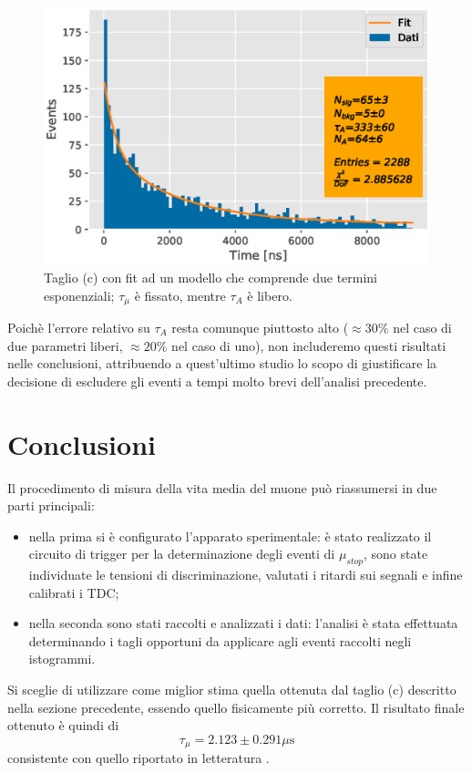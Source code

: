 \documentclass{standalone}
\begin{document}
\begin{figure}[H]
  \centering
  \includegraphics[width=\textwidth]{plots/soft_doubleexp_fixed.eps}
  \caption{Taglio (c) con fit ad un modello che comprende due termini esponenziali; $\tau_{\mu}$ \`e fissato, mentre $\tau_{A}$ è libero.}
  \label{fig:soft_doubleexp_fixed}
\end{figure}

Poich\`e l'errore relativo su $\tau_{A}$ resta comunque piuttosto alto ($\approx 30 \%$ nel caso di due parametri liberi, $\approx 20 \%$ nel caso di uno), non includeremo questi risultati nelle conclusioni, attribuendo a quest'ultimo studio lo scopo di giustificare la decisione di escludere gli eventi a tempi molto brevi dell'analisi precedente.

\chapter{Conclusioni}

Il procedimento di misura della vita media del muone pu\`o riassumersi in due parti principali:
\begin{itemize}
  \item nella prima si \`e configurato l'apparato sperimentale: \`e stato realizzato il circuito di trigger per la determinazione degli eventi di $\mu_{stop}$, sono state individuate le tensioni di discriminazione, valutati i ritardi sui segnali e infine calibrati i TDC;
  \item nella seconda sono stati raccolti e analizzati i dati: l'analisi \`e stata effettuata determinando i tagli opportuni da applicare agli eventi raccolti negli istogrammi.
\end{itemize}
Si sceglie di utilizzare come miglior stima quella ottenuta dal taglio (c) descritto nella sezione precedente, essendo quello fisicamente pi\`u corretto. Il risultato finale ottenuto \`e quindi di
\begin{equation}
  \tau_{\mu} = 2.123 \pm 0.291 \mu\text{s}
  \label{final_res}
\end{equation}
consistente con quello riportato in letteratura \cite{pdg}.
\end{document}
